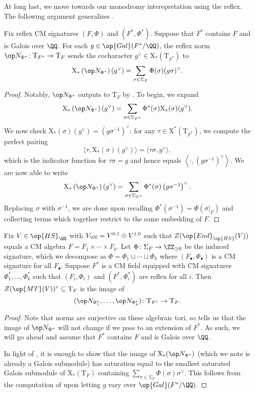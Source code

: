 \documentclass[../thesis.tex]{subfiles}
\begin{document}
At long last, we move towards our monodromy interepretation using the reflex. The following argument generalizes \cite[Lemma~4.2]{yu-mumford-tate-cm}.
\begin{lemma} \label{lem:reflex-norm-cochar}
	Fix reflex CM signatures $(F,\Phi)$ and $(F^*,\Phi^*)$. Suppose that $F^*$ contains $F$ and is Galois over $\QQ$. For each $g\in\op{Gal}(F^*/\QQ)$, the reflex norm $\op N_{\Phi^*}\colon\mathrm T_{F^*}\to\mathrm T_F$ sends the cocharacter $g^\lor\in\mathrm X_*(\mathrm T_{F^*})$ to
	\[\mathrm X_*\left(\op N_{\Phi^*}\right)(g^\lor)=\sum_{\sigma\in\Sigma_F}\Phi(\sigma)(g\sigma)^\lor.\]
\end{lemma}
\begin{proof}
	Notably, $\op N_{\Phi^*}$ outputs to $\mathrm T_F$ by . To begin, we expand
	\[\mathrm X_*\left(\op N_{\Phi^*}\right)(g^\lor)=\sum_{\sigma\in\Sigma_{F^*}}\Phi^*(\sigma)\mathrm X_*(\sigma)(g^\lor).\]
	We now check $\mathrm X_*(\sigma)(g^\lor)=\left(g\sigma^{-1}\right)^\lor$: for any $\tau\in\mathrm X^*(\mathrm T_{F^*})$, we compute the perfect pairing
	\[\langle\tau,\mathrm X_*(\sigma)(g^\lor)\rangle=\langle\tau\sigma,g^\lor\rangle,\]
	which is the indicator function for $\tau\sigma=g$ and hence equals $\left\langle\cdot,(g\sigma^{-1})^\lor\right\rangle$. We are now able to write
	\[\mathrm X_*\left(\op N_{\Phi^*}\right)(g^\lor)=\sum_{\sigma\in\Sigma_{F^*}}\Phi^*(\sigma)\left(g\sigma^{-1}\right)^\lor.\]
	Replacing $\sigma$ with $\sigma^{-1}$, we are done upon recalling $\Phi^*\left(\sigma^{-1}\right)=\Phi(\sigma|_F)$ and collecting terms which together restrict to the same embedding of $F$.
\end{proof}
\begin{proposition} \label{prop:z-mt-as-reflex-monodromy}
	Fix $V\in\op{HS}_\QQ$ with $V_\CC=V^{0,1}\oplus V^{1,0}$ such that $Z(\op{End}_{\op{HS}}(V))$ equals a CM algebra $F=F_1\times\cdots\times F_k$. Let $\Phi\colon\Sigma_F\to\ZZ_{\ge0}$ be the induced signature, which we decompose as $\Phi=\Phi_1\sqcup\cdots\sqcup\Phi_k$ where $(F_\bullet,\Phi_\bullet)$ is a CM signature for all $F_\bullet$. Suppose $F^*$ is a CM field equipped with CM signatures $\Phi_1^*,\ldots,\Phi_k^*$ such that $(F_i,\Phi_i)$ and $(F^*,\Phi_i^*)$ are reflex for all $i$. Then $Z(\op{MT}(V))^\circ\subseteq\mathrm T_F$ is the image of
	\[({\op N_{\Phi^*_1}},\ldots,{\op N_{\Phi_k^*}})\colon\mathrm T_{F^*}\to\mathrm T_F.\]
\end{proposition}
\begin{proof}
	Note that norms are surjective on these algebraic tori, so  tells us that the image of $\op N_{\Phi^*}$ will not change if we pass to an extension of $F^*$. As such, we will go ahead and assume that $F^*$ contains $F$ and is Galois over $\QQ$.

	In light of , it is enough to show that the image of $\mathrm X_*({\op N_{\Phi^*}})$ (which we note is already a Galois submodule) has saturation equal to the smallest saturated Galois submodule of $\mathrm X_*(\mathrm T_F)$ containing $\sum_{\sigma\in\Sigma_F}\Phi(\sigma)\sigma^\lor$. This follows from the computation of  upon letting $g$ vary over $\op{Gal}(F^*/\QQ)$. 
\end{proof}
\end{document}
